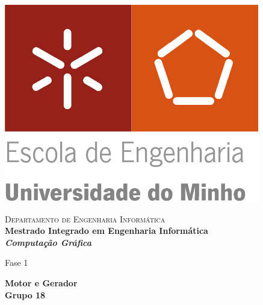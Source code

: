 \begin{titlepage}


\begin{minipage}{0.3\textwidth}
\begin{flushleft} 
\includegraphics[width=\textwidth]{logo.png}
\end{flushleft}
\end{minipage}
\begin{minipage}{0.6\textwidth}
\begin{flushright} 

\textsc{Departamento de Engenharia Informática}\\[0.1cm]
\bfseries Mestrado Integrado em Engenharia Informática \\ [0.1cm]
\bfseries \textit{Computação Gráfica}\\[8mm]

\end{flushright}
\end{minipage}


\vspace{3cm}


\begin{center}


\LARGE Fase 1

\Large \textbf{Motor e Gerador}\\[1.5cm]


{\Large \bfseries Grupo 18\\[2cm] }



\end{center}
\end{titlepage}
